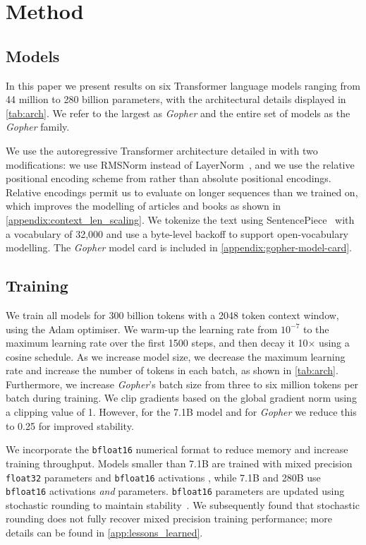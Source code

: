 \section{Method}
\label{sec:method}

\subsection{Models}
\label{method:models}
In this paper we present results on six Transformer language models ranging from 44 million to 280 billion parameters, with the architectural details displayed in \autoref{tab:arch}. We refer to the largest as \textit{Gopher} and the entire set of models as the \textit{Gopher} family.

We use the autoregressive Transformer architecture detailed in \citet{radford2019language} with two modifications: we use RMSNorm \citep{zhang2019root} instead of LayerNorm~\citep{ba2016layer}, and we use the relative positional encoding scheme from \citet{dai2019transformer} rather than absolute positional encodings. Relative encodings permit us to evaluate on longer sequences than we trained on, which improves the modelling of articles and books as shown in \autoref{appendix:context_len_scaling}.
We tokenize the text using SentencePiece~\citep{kudo2018sentencepiece} with a vocabulary of 32,000 and use a byte-level backoff to support open-vocabulary modelling. The \textit{Gopher} model card \citep{mitchell2019model} is included in \autoref{appendix:gopher-model-card}.

\subsection{Training}
\label{method:training}
We train all models for 300 billion tokens with a 2048 token context window, using the Adam \citep{kingma2014adam} optimiser. We warm-up the learning rate from $10^{-7}$ to the maximum learning rate over the first 1500 steps, and then decay it 10$\times$ using a cosine schedule. As we increase model size, we decrease the maximum learning rate and increase the number of tokens in each batch, as shown in \autoref{tab:arch}.
Furthermore, we increase \textit{Gopher}'s batch size from three to six million tokens per batch during training. We clip gradients based on the global gradient norm using a clipping value of 1. However, for the 7.1B model and for \textit{Gopher} we reduce this to 0.25 for improved stability.

We incorporate the \texttt{bfloat16} numerical format to reduce memory and increase training throughput. Models smaller than 7.1B are trained with mixed precision \texttt{float32} parameters and \texttt{bfloat16} activations \citep{micikevicius2017mixed}, while 7.1B and 280B use \texttt{bfloat16} activations \textit{and} parameters. \texttt{bfloat16} parameters are updated using stochastic rounding to maintain stability~\citep{gupta2015deep}. We subsequently found that stochastic rounding does not fully recover mixed precision training performance; more details can be found in \autoref{app:lessons_learned}.


